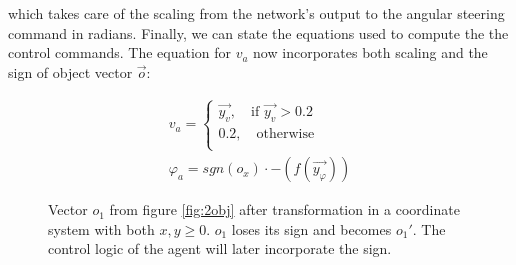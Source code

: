 \documentclass[10pt,a4paper,DIV=11]{scrreprt}
\begin{document}
which takes care of the scaling from the network's output to the angular steering command in radians. Finally, we can state the equations used to
compute the the control commands. The equation for $v_a$ now incorporates both scaling and the sign of object vector $\overrightarrow{o}$:

\begin{equation}
\begin{split}
	v_a=\begin{cases}
        \overrightarrow{y_v}, \quad \text{if } \overrightarrow{y_v} > 0.2 \\
		0.2, \quad \text{otherwise} \\
	\end{cases}
   \\ \varphi_a = sgn(o_x) \cdot -(f(\overrightarrow{y_{\varphi}}))
\end{split}
\end{equation}

\begin{center}
\begin{figure}
	\caption{Vector $o_1$ from figure \ref{fig:2obj} after transformation in a coordinate system with both $x,y \geq 0$. $o_1$ loses its sign and
    becomes $o_1'$. The control logic of the agent will later incorporate the sign.}
	\label{fig:tf}
\end{figure}
\end{center}
\end{document}
